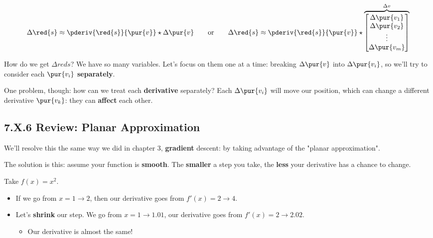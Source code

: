         \begin{equation}
            \Delta \red{s}
            \approx
            \pderiv{\red{s}}{ \pur{v} }  
            \star
            \Delta \pur{v}
                \qquad
                \text{or}
                \qquad
            \Delta \red{s}
            \approx
            \pderiv{\red{s}}{ \pur{v} } 
            \star
            \overbrace{
                \begin{bmatrix}
                    \Delta \pur{v_1}\\ \Delta \pur{v_2}\\ \vdots \\ \Delta \pur{v_m}
                \end{bmatrix}
            }^{\Delta v}
        \end{equation}
        
        How do we get $\Delta red{s}$? We have so many variables. Let's focus on them one at a time: breaking $\Delta \pur{v}$ into $\Delta \pur{v_i}$, so we'll try to consider each $\pur{v_i}$ \textbf{separately}.
        
        One problem, though: how can we treat each \textbf{derivative} separately? Each $\Delta \pur{v_i}$ will move our position, which can change a different derivative $\pur{v_k}$: they can \textbf{affect} each other.
    
    \secdiv
    
    \subsection*{7.X.6 \quad Review: Planar Approximation}
        
        We'll resolve this the same way we did in chapter 3, \textbf{gradient} descent: by taking advantage of the "planar approximation".
        
        The solution is this: assume your function is \textbf{smooth}. The \textbf{smaller} a step you take, the \textbf{less} your derivative has a chance to change.
        
        \miniex Take $f(x)=x^2$. 
        
        \begin{itemize}
            \item If we go from $x=1\rightarrow2$, then our derivative goes from $f'(x)=2 \rightarrow 4$.
            
            \item Let's \textbf{shrink} our step. We go from $x=1\rightarrow1.01$, our derivative goes from $f'(x)=2 \rightarrow 2.02$.
                \begin{itemize}
                    \item Our derivative is almost the same!
                \end{itemize}
        \end{itemize}
        
